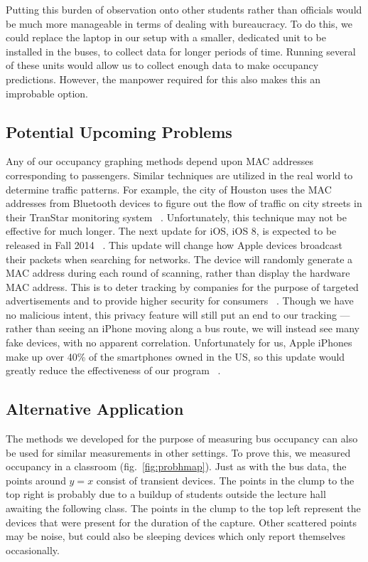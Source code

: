 Putting this burden of observation onto other students rather than officials would be much more manageable in terms of dealing with bureaucracy.
To do this, we could replace the laptop in our setup with a smaller, dedicated unit to be installed in the buses, to collect data for longer periods of time.
Running several of these units would allow us to collect enough data to make occupancy predictions.
However, the manpower required for this also makes this an improbable option.

\subsection{Potential Upcoming Problems}
Any of our occupancy graphing methods depend upon MAC addresses corresponding to passengers.
Similar techniques are utilized in the real world to determine traffic patterns. 
For example, the city of Houston uses the MAC addresses from Bluetooth devices to figure out the flow of traffic on city streets in their TranStar monitoring system ~\cite{ios8_privacy}.
Unfortunately, this technique may not be effective for much longer.
The next update for iOS, iOS 8, is expected to be released in Fall 2014 ~\cite{ios8_overview}.
This update will change how Apple devices broadcast their packets when searching for networks.
The device will randomly generate a MAC address during each round of scanning, rather than display the hardware MAC address.
This is to deter tracking by companies for the purpose of targeted advertisements and to provide higher security for consumers ~\cite{ios8_privacy}.
Though we have no malicious intent, this privacy feature will still put an end to our tracking --- rather than seeing an iPhone moving along a bus route, we will instead see many fake devices, with no apparent correlation.
Unfortunately for us, Apple iPhones make up over 40\% of the smartphones owned in the US, so this update would greatly reduce the effectiveness of our program ~\cite{iphone_ownership}.

\subsection{Alternative Application}
The methods we developed for the purpose of measuring bus occupancy can also be used for similar measurements in other settings.
To prove this, we measured occupancy in a classroom (fig.~\ref{fig:probhmap}).
Just as with the bus data, the points around \(y=x\) consist of transient devices.
The points in the clump to the top right is probably due to a buildup of students outside the lecture hall awaiting the following class.
The points in the clump to the top left represent the devices that were present for the duration of the capture.
Other scattered points may be noise, but could also be sleeping devices which only report themselves occasionally.

